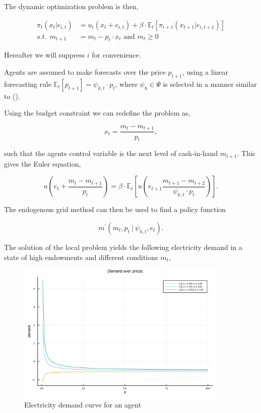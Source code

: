 \documentclass[american]{scrartcl}
\newcommand{\E}{\mathbb{E}}
\begin{document}
The dynamic optimization problem is then,

\begin{equation*}
    \begin{split}
        \pi_t(x_t \vert e_{i, t}) &= u_i(x_t + e_{i, t}) + \beta \cdot \E_t \left[ \pi_{t+1}(x_{t+1} \vert e_{i, t+1}) \right] \\
        s.t. \ \ m_{t+1} &= m_t - p_t \cdot x_t \text{ and } m_t \geq 0
    \end{split}
\end{equation*}

Hereafter we will suppress $i$ for convenience.

Agents are assumed to make forecasts over the price $p_{t+1}$, using a linear forecasting rule $\E_t[p_{t+1}] = \psi_{h, t} \cdot p_t$, where $\psi_h \in \Psi$ is selected in a manner similar to \citeauthor{Hommes2013} (\citeyear{Hommes2013}).

Using the budget constraint we can redefine the problem as,

\begin{equation}
    x_t = \frac{m_t - m_{t+1}}{p_t},
\end{equation}

such that the agents control variable is the next level of cash-in-hand $m_{t+1}$. This gives the Euler equation,

\begin{equation}
    u\left( e_t + \frac{m_t - m_{t+1}}{p_t} \right) = \beta \cdot \E_t \left[ u\left(e_{t+1} \frac{m_{t+1} - m_{t+2}}{ \psi_{h, t} \cdot p_t} \right)  \right].
\end{equation}

The endogenous grid method can then be used to find a policy function

\begin{equation}
    m^\prime(m_t, p_t \ \vert \ \psi_{h, t}, e_t).
\end{equation}

The solution of the local problem yields the following electricity demand in a state of high endowments and different conditions $m_t$,

\begin{figure}[h]
    \caption{Electricity demand curve for an agent}
    \centering
    \includegraphics[width=0.9\textwidth]{../../plots/markets/pricedemand.png}
\end{figure}
\end{document}

